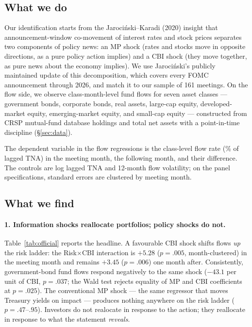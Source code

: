 \documentclass[11pt]{article}
\newcommand{\jk}{Jaroci\'{n}ski--Karadi}
\begin{document}
\subsection{What we do}\label{sec:whatwedo}

Our identification starts from the \jk{} (2020) insight that announcement-window
co-movement of interest rates and stock prices separates two components of
policy news: an MP shock (rates and stocks move in opposite directions, as a
pure policy action implies) and a CBI shock (they move together, as pure news
about the economy implies). We use Jaroci\'{n}ski's publicly maintained update
of this decomposition, which covers every FOMC announcement through 2026, and
match it to our sample of 161 meetings. On the flow side, we observe
class-month-level fund flows for seven asset classes --- government bonds,
corporate bonds, real assets, large-cap equity, developed-market equity,
emerging-market equity, and small-cap equity --- constructed from CRSP
mutual-fund database holdings and total net assets with a point-in-time
discipline (\S\ref{sec:data}).

The dependent variable in the flow regressions is the class-level flow rate
(\% of lagged TNA) in the meeting month, the following month, and their
difference. The controls are log lagged TNA and 12-month flow volatility; on
the panel specifications, standard errors are clustered by meeting month.

\subsection{What we find}\label{sec:findings}

\paragraph{1. Information shocks reallocate portfolios; policy shocks do not.}
Table~\ref{tab:official} reports the headline. A favourable CBI shock shifts
flows \emph{up} the risk ladder: the Risk$\times$CBI interaction is $+5.28$
($p=.005$, month-clustered) in the meeting month and remains $+3.45$
($p=.006$) one month after. Consistently, government-bond fund flows respond
negatively to the same shock ($-43.1$ per unit of CBI, $p=.037$; the Wald test
rejects equality of MP and CBI coefficients at $p=.025$). The conventional MP
shock --- the same regressor that moves Treasury yields on impact --- produces
nothing anywhere on the risk ladder ($p=.47$--$.95$). Investors do not
realocate in response to the action; they reallocate in response to what the
statement \emph{reveals}.
\end{document}
